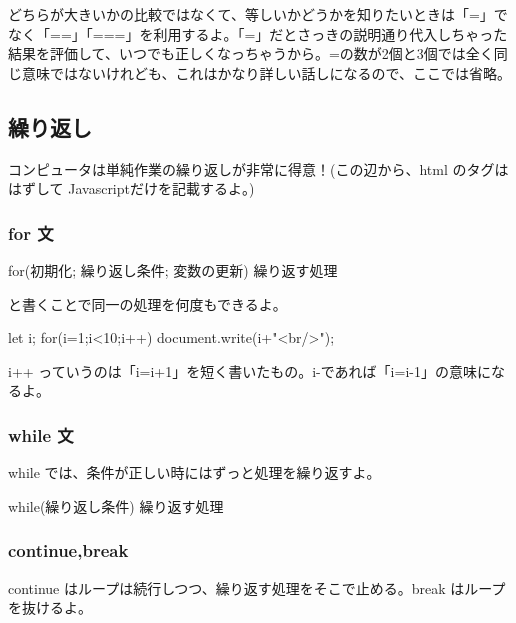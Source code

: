 \documentclass[mingoth,11pt,a4j,uplatex]{jsarticle}
\begin{document}
どちらが大きいかの比較ではなくて、等しいかどうかを知りたいときは「=」でなく「==」「===」を利用するよ。「=」だとさっきの説明通り代入しちゃった結果を評価して、いつでも正しくなっちゃうから。=の数が2個と3個では全く同じ意味ではないけれども、これはかなり詳しい話しになるので、ここでは省略。

\subsection{繰り返し}
コンピュータは単純作業の繰り返しが非常に得意！(この辺から、html のタグははずして Javascriptだけを記載するよ。)
\subsubsection{for 文}
\begin{verbatimtab}
for(初期化; 繰り返し条件; 変数の更新){
	繰り返す処理
}
\end{verbatimtab}
と書くことで同一の処理を何度もできるよ。
\begin{verbatimtab}
	let i;
	for(i=1;i<10;i++){
		 document.write(i+"<br/>");
	}
\end{verbatimtab}
i++ っていうのは「i=i+1」を短く書いたもの。i-であれば「i=i-1」の意味になるよ。 

\subsubsection{while 文}
while では、条件が正しい時にはずっと処理を繰り返すよ。
\begin{verbatimtab}
while(繰り返し条件){
	繰り返す処理
}
\end{verbatimtab}
\subsubsection{continue,break}
continue はループは続行しつつ、繰り返す処理をそこで止める。break はループを抜けるよ。
\end{document}
